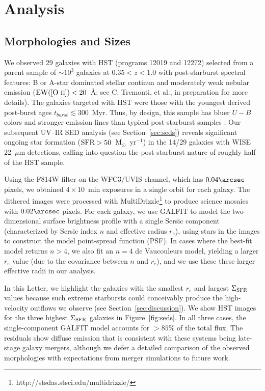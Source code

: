 \documentclass[12pt,preprint]{aastex}
\newcommand{\oii}{[\textrm{O}~\textsc{ii}]}
\newcommand{\msun}{M$_{\odot}$}
\newcommand{\sigmasfr}{\Sigma_{\textnormal{\scriptsize{SFR}}}}
\begin{document}
\section{Analysis}

\subsection{Morphologies and Sizes}

We observed 29 galaxies with HST (programs 12019 and 12272) selected
from a parent sample of $\sim10^3$ galaxies at $0.35<z<1.0$ with
post-starburst spectral features: B or A-star dominated stellar
continua and moderately weak nebular emission
($\textnormal{EW}(\oii)<20$~\AA; see C. Tremonti, et al., in
preparation for more details).  The galaxies targeted with HST were
those with the youngest derived post-burst ages
$t_{burst}\lesssim300$~Myr.  Thus, by design, this sample has bluer
$U-B$ colors and stronger emission lines than typical post-starburst
samples \citep{coi11}.  Our subsequent UV--IR SED analysis (see
Section~\ref{sec:seds}) reveals significant ongoing star formation
($\textnormal{SFR}>50$~\msun~yr$^{-1}$) in the 14/29 galaxies with
WISE 22~$\mu$m detections, calling into question the post-starburst
nature of roughly half of the HST sample.

Using the F814W filter on the WFC3/UVIS channel, which has
$0.04\arcsec$ pixels, we obtained $4\times10$~min exposures in a
single orbit for each galaxy.  The dithered images were processed with
MultiDrizzle\footnote{http://stsdas.stsci.edu/multidrizzle/} to
produce science mosaics with $0.02\arcsec$ pixels.  For each galaxy,
we use GALFIT \citep{pen02} to model the two-dimensional surface
brightness profile with a single Sersic component (characterized by
Sersic index $n$ and effective radius $r_e$), using stars in the
images to construct the model point-spread function (PSF).  In cases
where the best-fit model returns $n>4$, we also fit an $n=4$ de
Vaucouleurs model, yielding a larger $r_e$ value (due to the
covariance between $n$ and $r_e$), and we use these these larger
effective radii in our analysis.

In this Letter, we highlight the galaxies with the smallest $r_e$ and
largest $\sigmasfr$ values because such extreme starbursts could
conceivably produce the high-velocity outflows we observe (see
Section~\ref{sec:discussion}).  We show HST images for the three
highest $\sigmasfr$ galaxies in Figure~\ref{fig:seds}.  In all three
cases, the single-component GALFIT model accounts for $>85\%$ of the
total flux.  The residuals show diffuse emission that is consistent
with these systems being late-stage galaxy mergers, although we defer
a detailed comparison of the observed morphologies with expectations
from merger simulations to future work.
\end{document}
